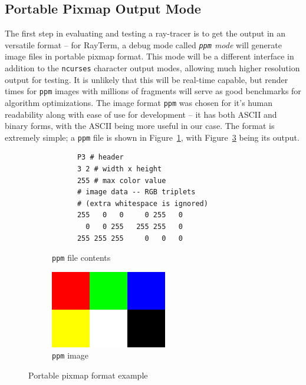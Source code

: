 \documentclass[11pt]{article}
\newcommand{\name}{{\sc RayTerm}}
\begin{document}
\subsection{Portable Pixmap Output Mode}
\label{sec:evaluate:ppm_mode}

The first step in evaluating and testing a ray-tracer is to get the output in an versatile format -- for \name, a debug mode called {\it \texttt{ppm} mode} will generate image files in portable pixmap format.
This mode will be a different interface in addition to the \texttt{ncurses} character output modes, allowing much higher resolution output for testing.
It is unlikely that this will be real-time capable, but render times for \texttt{ppm} images with millions of fragments will serve as good benchmarks for algorithm optimizations.
The image format \texttt{ppm} was chosen for it's human readability along with ease of use for development -- it has both ASCII and binary forms, with the ASCII being more useful in our case.
The format is extremely simple; a \texttt{ppm} file is shown in Figure~\ref{fig:ppm_code}, with Figure~\ref{fig:ppm_image} being its output.

\begin{figure}[htb]
  \begin{subfigure}[htb]{0.5\textwidth}
    \small
    \vspace{2.6em}
    \begin{verbatim}
      P3 # header
      3 2 # width x height
      255 # max color value
      # image data -- RGB triplets
      # (extra whitespace is ignored)
      255   0   0     0 255   0
        0   0 255   255 255   0
      255 255 255     0   0   0
    \end{verbatim}
    \caption{\texttt{ppm} file contents}
    \label{fig:ppm_code}
  \end{subfigure}
  \begin{subfigure}[htb]{0.5\textwidth}
    \includegraphics[width=\textwidth]{resources/ppm_example}
    \caption{\texttt{ppm} image}
    \label{fig:ppm_image}
  \end{subfigure}
  \caption{Portable pixmap format example}
\end{figure}
\end{document}
